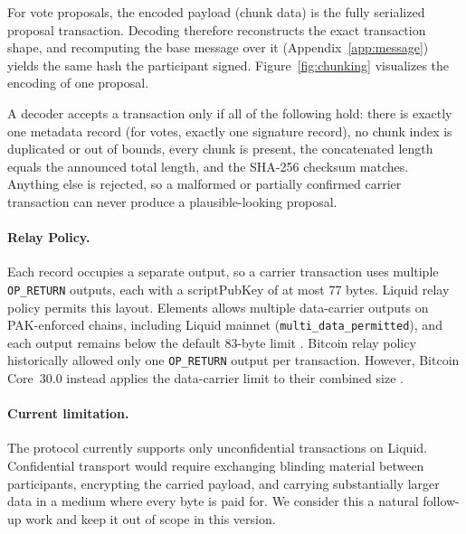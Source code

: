 \documentclass[11pt]{article}
\begin{document}
    For vote proposals, the encoded payload (chunk data) is the fully serialized proposal transaction. Decoding therefore reconstructs the exact transaction shape, and recomputing the base message over it (Appendix~\ref{app:message}) yields the same hash the participant signed. Figure~\ref{fig:chunking} visualizes the encoding of one proposal.

    A decoder accepts a transaction only if all of the following hold: there is exactly one metadata record (for votes, exactly one signature record), no chunk index is duplicated or out of bounds, every chunk is present, the concatenated length equals the announced total length, and the SHA-256 checksum matches. Anything else is rejected, so a malformed or partially confirmed carrier transaction can never produce a plausible-looking proposal.

    \paragraph{Relay Policy.}
    Each record occupies a separate output, so a carrier transaction uses multiple \texttt{OP\_RETURN} outputs, each with a scriptPubKey of at most 77 bytes. Liquid relay policy permits this layout. Elements allows multiple data-carrier outputs on PAK-enforced chains, including Liquid mainnet (\texttt{multi\_data\_permitted}),
    and each output remains below the default 83-byte limit \cite{elements-policy}. Bitcoin relay policy historically allowed only one \texttt{OP\_RETURN} output per transaction. However,
    Bitcoin Core~30.0 instead applies the data-carrier limit to their combined size \cite{bitcoin-core-30}.

    \paragraph{Current limitation.}
    The protocol currently supports only unconfidential transactions on Liquid. Confidential transport would require exchanging blinding material between participants, encrypting the carried payload, and carrying substantially larger data in a medium where every byte is paid for. We consider this a natural follow-up work and keep it out of scope in this version.
\end{document}
